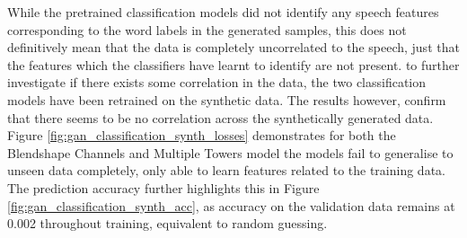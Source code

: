 While the pretrained classification models did not identify any speech features corresponding to the word labels in the generated samples, this does not definitively mean that the data is completely uncorrelated to the speech, just that the features which the classifiers have learnt to identify are not present.
to further investigate if there exists some correlation in the data, the two classification models have been retrained on the synthetic data.
The results however, confirm that there seems to be no correlation across the synthetically generated data.
Figure \ref{fig:gan_classification_synth_losses} demonstrates for both the Blendshape Channels and Multiple Towers model the models fail to generalise to unseen data completely, only able to learn features related to the training data.
The prediction accuracy further highlights this in Figure \ref{fig:gan_classification_synth_acc}, as accuracy on the validation data remains at 0.002 throughout training, equivalent to random guessing.

